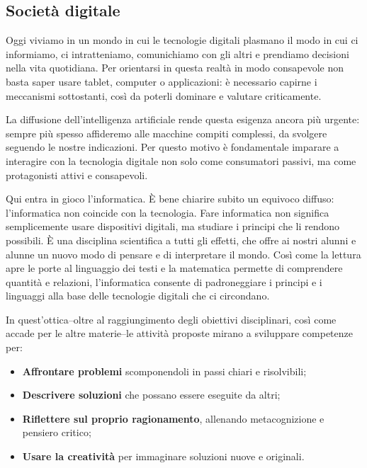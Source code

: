 \subsection{Società digitale }\label{societuxe0-digitale}

Oggi viviamo in un mondo in cui le tecnologie digitali plasmano il modo in cui ci informiamo, ci intratteniamo, comunichiamo con gli altri e prendiamo decisioni nella vita quotidiana. Per orientarsi in questa realtà in modo consapevole non basta saper usare tablet, computer o applicazioni: è necessario capirne i meccanismi sottostanti, così da poterli dominare e valutare criticamente.

La diffusione dell'intelligenza artificiale rende questa esigenza ancora più urgente: sempre più spesso affideremo alle macchine compiti complessi, da svolgere seguendo le nostre indicazioni. Per questo motivo è fondamentale imparare a interagire con la tecnologia digitale non solo come consumatori passivi, ma come protagonisti attivi e consapevoli.

Qui entra in gioco l'informatica. È bene chiarire subito un equivoco diffuso: l'informatica non coincide con la tecnologia. Fare informatica non significa semplicemente usare dispositivi digitali, ma studiare i principi che li rendono possibili. È una disciplina scientifica a tutti gli effetti, che offre ai nostri alunni e alunne un nuovo modo di pensare e di interpretare il mondo. Così come la lettura apre le porte al linguaggio dei testi e la matematica permette di comprendere quantità e relazioni, l'informatica consente di padroneggiare i principi e i linguaggi alla base delle tecnologie digitali che ci circondano.

In quest'ottica--oltre al raggiungimento degli obiettivi disciplinari, così come accade per le altre materie--le attività proposte mirano a sviluppare competenze per:

\begin{itemize}
\item
  \textbf{Affrontare problemi} scomponendoli in passi chiari e risolvibili;
\item
  \textbf{Descrivere soluzioni} che possano essere eseguite da altri;
\item
  \textbf{Riflettere sul proprio ragionamento}, allenando metacognizione e pensiero critico;
\item
  \textbf{Usare la creatività} per immaginare soluzioni nuove e originali.
\end{itemize}

